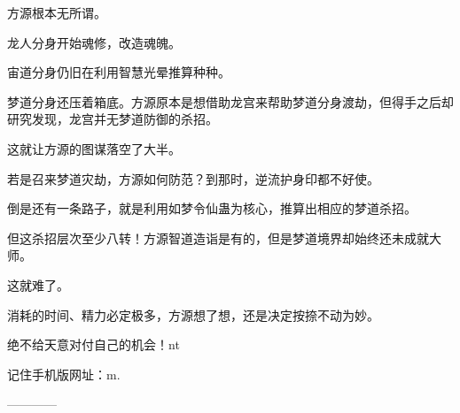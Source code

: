 \begin{this_body}
方源根本无所谓。

龙人分身开始魂修，改造魂魄。

宙道分身仍旧在利用智慧光晕推算种种。

梦道分身还压着箱底。方源原本是想借助龙宫来帮助梦道分身渡劫，但得手之后却研究发现，龙宫并无梦道防御的杀招。

这就让方源的图谋落空了大半。

若是召来梦道灾劫，方源如何防范？到那时，逆流护身印都不好使。

倒是还有一条路子，就是利用如梦令仙蛊为核心，推算出相应的梦道杀招。

但这杀招层次至少八转！方源智道造诣是有的，但是梦道境界却始终还未成就大师。

这就难了。

消耗的时间、精力必定极多，方源想了想，还是决定按捺不动为妙。

绝不给天意对付自己的机会！nt

记住手机版网址：m.

------------

\end{this_body}

